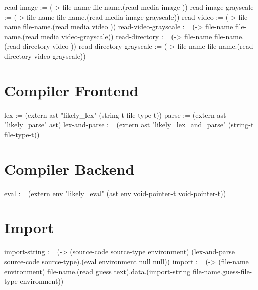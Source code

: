 \documentclass[numbers=noenddot]{scrbook}
\newenvironment{likely}
{ \verbatim }
{ \endverbatim }
\begin{document}
\begin{likely}
read-image               := (-> file-name file-name.(read media     image          ))
read-image-grayscale     := (-> file-name file-name.(read media     image-grayscale))
read-video               := (-> file-name file-name.(read media     video          ))
read-video-grayscale     := (-> file-name file-name.(read media     video-grayscale))
read-directory           := (-> file-name file-name.(read directory video          ))
read-directory-grayscale := (-> file-name file-name.(read directory video-grayscale))
\end{likely}

\section{Compiler Frontend}
\begin{likely}
lex := (extern ast "likely_lex" (string-t file-type-t))
parse := (extern ast "likely_parse" ast)
lex-and-parse := (extern ast "likely_lex_and_parse" (string-t file-type-t))
\end{likely}

\section{Compiler Backend}
\begin{likely}
eval := (extern env "likely_eval" (ast env void-pointer-t void-pointer-t))
\end{likely}

\section{Import}
\begin{likely}
import-string := (-> (source-code source-type environment) (lex-and-parse source-code source-type).(eval environment null null))
import := (-> (file-name environment) file-name.(read guess text).data.(import-string file-name.guess-file-type environment))
\end{likely}
\end{document}
